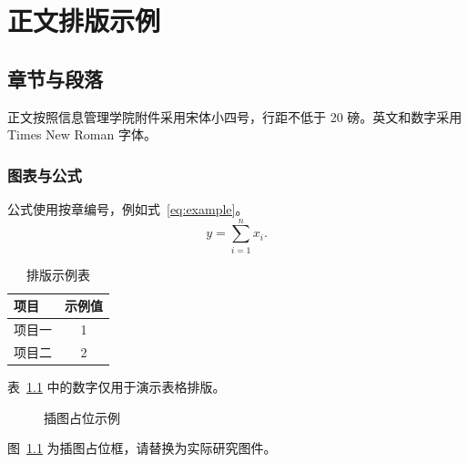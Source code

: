 \chapter{正文排版示例}
\section{章节与段落}
正文按照信息管理学院附件采用宋体小四号，行距不低于 20 磅。英文和数字采用 Times New Roman 字体。
\subsection{图表与公式}
公式使用按章编号，例如式~\eqref{eq:example}。
\begin{equation}
  y = \sum_{i=1}^{n} x_i .
  \label{eq:example}
\end{equation}
\begin{table}[htbp]
  \centering
  \caption{排版示例表}
  \label{tab:example}
  \begin{tabular}{lc}
    \toprule
    项目 & 示例值 \\
    \midrule
    项目一 & 1 \\
    项目二 & 2 \\
    \bottomrule
  \end{tabular}
\end{table}
表~\ref{tab:example} 中的数字仅用于演示表格排版。
\begin{figure}[htbp]
  \centering
  \fbox{\rule{0pt}{25mm}\rule{0.6\textwidth}{0pt}}
  \caption{插图占位示例}
  \label{fig:example}
\end{figure}
图~\ref{fig:example} 为插图占位框，请替换为实际研究图件。
